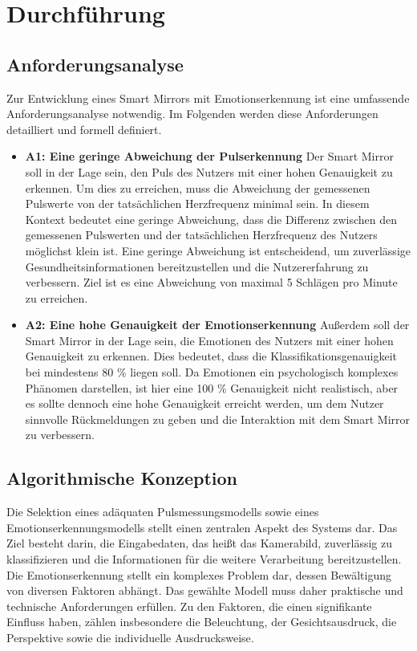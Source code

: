 \chapter{Durchführung}
\section{Anforderungsanalyse}
Zur Entwicklung eines Smart Mirrors mit Emotionserkennung ist eine umfassende Anforderungsanalyse notwendig. Im Folgenden werden diese Anforderungen detailliert und formell definiert.
\begin{itemize}
    \item[] \textbf{A1: Eine geringe Abweichung der Pulserkennung}
    \newline
    Der Smart Mirror soll in der Lage sein, den Puls des Nutzers mit einer hohen Genauigkeit zu erkennen. Um dies zu erreichen, muss die Abweichung der gemessenen Pulswerte von der tatsächlichen Herzfrequenz minimal sein. In diesem Kontext bedeutet eine geringe Abweichung, dass die Differenz zwischen den gemessenen Pulswerten und der tatsächlichen Herzfrequenz des Nutzers möglichst klein ist. Eine geringe Abweichung ist entscheidend, um zuverlässige Gesundheitsinformationen bereitzustellen und die Nutzererfahrung zu verbessern. Ziel ist es eine Abweichung von maximal 5 Schlägen pro Minute zu erreichen. 
    \item[] \textbf{A2: Eine hohe Genauigkeit der Emotionserkennung}
    \newline
    Außerdem soll der Smart Mirror in der Lage sein, die Emotionen des Nutzers mit einer hohen Genauigkeit zu erkennen. Dies bedeutet, dass die Klassifikationsgenauigkeit bei mindestens 80 \% liegen soll. Da Emotionen ein psychologisch komplexes Phänomen darstellen, ist hier eine 100 \% Genauigkeit nicht realistisch, aber es sollte dennoch eine hohe Genauigkeit erreicht werden, um dem Nutzer sinnvolle Rückmeldungen zu geben und die Interaktion mit dem Smart Mirror zu verbessern.
\end{itemize}

\section{Algorithmische Konzeption}

Die Selektion eines adäquaten Pulsmessungsmodells sowie eines Emotionserkennungsmodells stellt einen zentralen Aspekt des Systems dar. Das Ziel besteht darin, die Eingabedaten, das heißt das Kamerabild, zuverlässig zu klassifizieren und die Informationen für die weitere Verarbeitung bereitzustellen.  Die Emotionserkennung stellt ein komplexes Problem dar, dessen Bewältigung von diversen Faktoren abhängt. Das gewählte Modell muss daher praktische und technische Anforderungen erfüllen. Zu den Faktoren, die einen signifikante Einfluss haben, zählen insbesondere die Beleuchtung, der Gesichtsausdruck, die Perspektive sowie die individuelle Ausdrucksweise.

